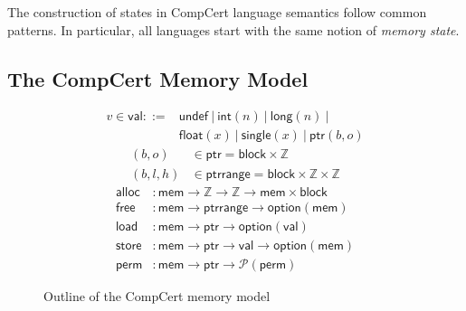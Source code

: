 \documentclass[sigplan,10pt,review,anonymous]{acmart}
\newcommand{\kw}[1]{\ensuremath{ \mathsf{#1} }}
\newcommand{\alt}{\ |\ } %
\begin{document}
%

The construction of states in CompCert language semantics
follow common patterns.
In particular,
all languages start with
the same notion of \emph{memory state}.


\subsection{The CompCert Memory Model} \label{sec:sem:mm} %

\begin{figure} %
  \begin{align*}
    v \in \kw{val} ::= {} &
          \kw{undef} \alt
          \kw{int}(n) \alt
          \kw{long}(n) \alt \\ &
          \kw{float}(x) \alt
          \kw{single}(x) \alt
          \kw{ptr}(b, o)
  \end{align*}
  \begin{align*}
    (b, o) &\in \kw{ptr} =
      \kw{block} \times \mathbb{Z}
    \\
    (b, l, h) &\in \kw{ptrrange} =
      \kw{block} \times \mathbb{Z} \times \mathbb{Z}
  \end{align*}
  \begin{align*}
    \kw{alloc} &:
      \kw{mem} \rightarrow \mathbb{Z} \rightarrow \mathbb{Z} \rightarrow
      \kw{mem} \times \kw{block}
    \\
    \kw{free} &:
      \kw{mem} \rightarrow
      \kw{ptrrange} \rightarrow
      \kw{option}(\kw{mem})
    \\
    \kw{load} &:
      \kw{mem} \rightarrow \kw{ptr} \rightarrow \kw{option}(\kw{val})
    \\
    \kw{store} &:
      \kw{mem} \rightarrow \kw{ptr} \rightarrow \kw{val} \rightarrow \kw{option}(\kw{mem})
    \\
    \kw{perm} &:
      \kw{mem} \rightarrow \kw{ptr} \rightarrow \mathcal{P}(\kw{perm})
  \end{align*}
  \caption{Outline of the CompCert memory model}
  \label{fig:mm}
\end{figure}
\end{document}
